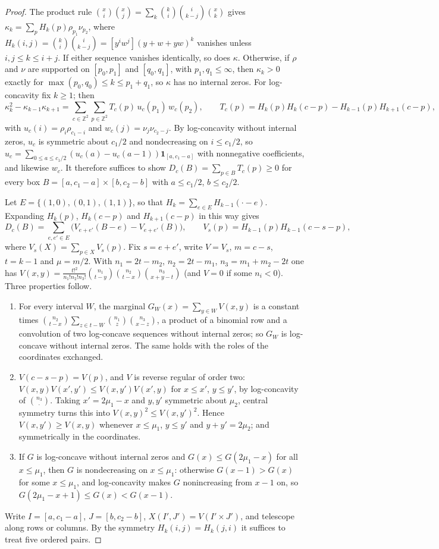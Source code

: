 \documentclass[twoside,10pt]{article}
\numberwithin{equation}{section}
\theoremstyle{slbody}
\theoremstyle{definition}
\theoremstyle{remark}
\begin{document}
\begin{proof}
The product rule $\binom xi\binom xj=\sum_k\binom ki\binom i{k-j}\binom xk$ gives $\kappa_k=\sum_pH_k(p)\rho_{p_1}\nu_{p_2}$, where $H_k(i,j)=\binom ki\binom i{k-j}=[y^iw^j](y+w+yw)^k$ vanishes unless $i,j\leq k\leq i+j$. If either sequence vanishes identically, so does $\kappa$. Otherwise, if $\rho$ and $\nu$ are supported on $[p_0,p_1]$ and $[q_0,q_1]$, with $p_1,q_1\leq\infty$, then $\kappa_k>0$ exactly for $\max(p_0,q_0)\leq k\leq p_1+q_1$, so $\kappa$ has no internal zeros. For log-concavity fix $k\geq1$; then
\[
\kappa_k^2-\kappa_{k-1}\kappa_{k+1}=\sum_{c\in\mathbb Z^2}\sum_{p\in\mathbb Z^2}T_c(p)\,u_c(p_1)\,w_c(p_2),\qquad T_c(p)=H_k(p)H_k(c-p)-H_{k-1}(p)H_{k+1}(c-p),
\]
with $u_c(i)=\rho_i\rho_{c_1-i}$ and $w_c(j)=\nu_j\nu_{c_2-j}$. By log-concavity without internal zeros, $u_c$ is symmetric about $c_1/2$ and nondecreasing on $i\leq c_1/2$, so $u_c=\sum_{0\leq a\leq c_1/2}(u_c(a)-u_c(a-1))\mathbf 1_{[a,c_1-a]}$ with nonnegative coefficients, and likewise $w_c$. It therefore suffices to show $D_c(B)=\sum_{p\in B}T_c(p)\geq0$ for every box $B=[a,c_1-a]\times[b,c_2-b]$ with $a\leq c_1/2$, $b\leq c_2/2$.

Let $E=\{(1,0),(0,1),(1,1)\}$, so that $H_k=\sum_{e\in E}H_{k-1}(\cdot-e)$. Expanding $H_k(p)$, $H_k(c-p)$ and $H_{k+1}(c-p)$ in this way gives
\[
D_c(B)=\sum_{e,e'\in E}\bigl(V_{e+e'}(B-e)-V_{e+e'}(B)\bigr),\qquad V_s(p)=H_{k-1}(p)H_{k-1}(c-s-p),
\]
where $V_s(X)=\sum_{p\in X}V_s(p)$. Fix $s=e+e'$, write $V=V_s$, $m=c-s$, $t=k-1$ and $\mu=m/2$. With $n_1=2t-m_2$, $n_2=2t-m_1$, $n_3=m_1+m_2-2t$ one has $V(x,y)=\frac{t!^2}{n_1!n_2!n_3!}\binom{n_1}{t-y}\binom{n_2}{t-x}\binom{n_3}{x+y-t}$ (and $V=0$ if some $n_i<0$). Three properties follow.
\begin{enumerate}
\item[(T1)] For every interval $W$, the marginal $G_W(x)=\sum_{y\in W}V(x,y)$ is a constant times $\binom{n_2}{t-x}\sum_{z\in t-W}\binom{n_1}z\binom{n_3}{x-z}$, a product of a binomial row and a convolution of two log-concave sequences without internal zeros; so $G_W$ is log-concave without internal zeros. The same holds with the roles of the coordinates exchanged.
\item[(T2)] $V(c-s-p)=V(p)$, and $V$ is reverse regular of order two: $V(x,y)V(x',y')\leq V(x,y')V(x',y)$ for $x\leq x'$, $y\leq y'$, by log-concavity of $\binom{n_3}{\cdot}$. Taking $x'=2\mu_1-x$ and $y,y'$ symmetric about $\mu_2$, central symmetry turns this into $V(x,y)^2\leq V(x,y')^2$. Hence $V(x,y')\geq V(x,y)$ whenever $x\leq\mu_1$, $y\leq y'$ and $y+y'=2\mu_2$; and symmetrically in the coordinates.
\item[(T3)] If $G$ is log-concave without internal zeros and $G(x)\leq G(2\mu_1-x)$ for all $x\leq\mu_1$, then $G$ is nondecreasing on $x\leq\mu_1$: otherwise $G(x-1)>G(x)$ for some $x\leq\mu_1$, and log-concavity makes $G$ nonincreasing from $x-1$ on, so $G(2\mu_1-x+1)\leq G(x)<G(x-1)$.
\end{enumerate}
Write $I=[a,c_1-a]$, $J=[b,c_2-b]$, $X(I',J')=V(I'\times J')$, and telescope along rows or columns. By the symmetry $H_k(i,j)=H_k(j,i)$ it suffices to treat five ordered pairs.


\end{proof}
\end{document}
